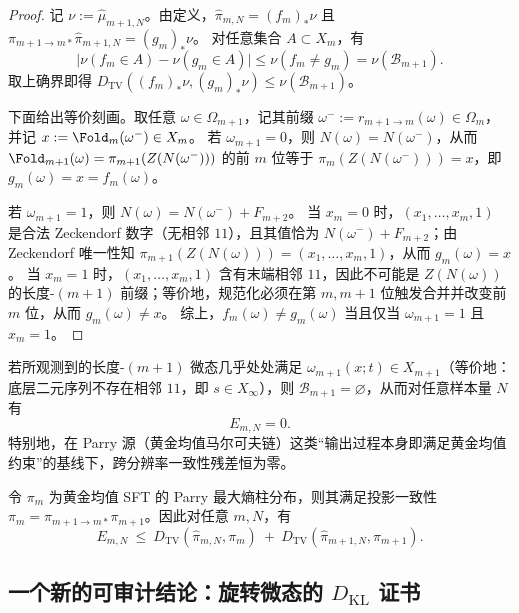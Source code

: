 \begin{proof}
记 $\nu:=\hat\mu_{m+1,N}$。由定义，$\hat\pi_{m,N}=(f_m)_*\nu$ 且 $\pi_{m+1\to m*}\hat\pi_{m+1,N}=(g_m)_*\nu$。
对任意集合 $A\subset X_m$，有
\[
\bigl|\nu(f_m\in A)-\nu(g_m\in A)\bigr|\le \nu(f_m\ne g_m)=\nu(\mathcal{B}_{m+1}).
\]
取上确界即得 $D_{\mathrm{TV}}((f_m)_*\nu,(g_m)_*\nu)\le \nu(\mathcal{B}_{m+1})$。

下面给出等价刻画。取任意 $\omega\in\Omega_{m+1}$，记其前缀 $\omega^-:=r_{m+1\to m}(\omega)\in\Omega_m$，并记 $x:=\Fold_m(\omega^-)\in X_m$。
若 $\omega_{m+1}=0$，则 $N(\omega)=N(\omega^-)$，从而
\(
\Fold_{m+1}(\omega)=\pi_{m+1}(Z(N(\omega^-)))
\)
的前 $m$ 位等于 $\pi_m(Z(N(\omega^-)))=x$，即 $g_m(\omega)=x=f_m(\omega)$。

若 $\omega_{m+1}=1$，则 $N(\omega)=N(\omega^-)+F_{m+2}$。
当 $x_m=0$ 时，$(x_1,\dots,x_m,1)$ 是合法 Zeckendorf 数字（无相邻 $11$），且其值恰为 $N(\omega^-)+F_{m+2}$；由 Zeckendorf 唯一性知
\(
\pi_{m+1}(Z(N(\omega)))=(x_1,\dots,x_m,1)
\)，从而 $g_m(\omega)=x$。
当 $x_m=1$ 时，$(x_1,\dots,x_m,1)$ 含有末端相邻 $11$，因此不可能是 $Z(N(\omega))$ 的长度-$(m{+}1)$ 前缀；等价地，规范化必须在第 $m,m{+}1$ 位触发合并并改变前 $m$ 位，从而 $g_m(\omega)\ne x$。
综上，$f_m(\omega)\ne g_m(\omega)$ 当且仅当 $\omega_{m+1}=1$ 且 $x_m=1$。
\end{proof}

\begin{corollary}\label{cor:multiscale-zero-stable}
若所观测到的长度-$(m{+}1)$ 微态几乎处处满足 $\omega_{m+1}(x;t)\in X_{m+1}$（等价地：底层二元序列不存在相邻 $11$，即 $s\in X_\infty$），则 $\mathcal{B}_{m+1}=\varnothing$，从而对任意样本量 $N$ 有
\[
E_{m,N}=0.
\]
特别地，在 Parry 源（黄金均值马尔可夫链）这类“输出过程本身即满足黄金均值约束”的基线下，跨分辨率一致性残差恒为零。
\end{corollary}

\begin{proposition}\label{prop:multiscale-residual-parry-bound}
令 \(\pi_m\) 为黄金均值 SFT 的 Parry 最大熵柱分布，则其满足投影一致性 \(\pi_m=\pi_{m+1\to m*}\pi_{m+1}\)。因此对任意 \(m,N\)，有
\[
E_{m,N}\ \le\ D_{\mathrm{TV}}(\hat{\pi}_{m,N},\pi_m)\ +\ D_{\mathrm{TV}}(\hat{\pi}_{m+1,N},\pi_{m+1}).
\]
\end{proposition}



\subsection{一个新的可审计结论：旋转微态的 \texorpdfstring{$D_{\mathrm{KL}}$}{KL} 证书}

